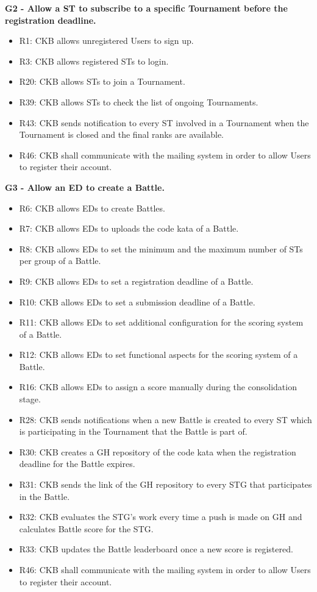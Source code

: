 \vspace{1.5cm}
\textbf{G2 - Allow a ST to subscribe to a specific Tournament before the registration deadline.}
\begin{itemize}
    \item R1: CKB allows unregistered Users to sign up.
    \item R3: CKB allows registered STs to login.
    \item R20: CKB allows STs to join a Tournament.
    \item R39: CKB allows STs to check the list of ongoing Tournaments.
    \item R43: CKB sends notification to every ST involved in a Tournament when the Tournament is closed and the final ranks are available.
    \item R46: CKB shall communicate with the mailing system in order to allow Users to register their account.
\end{itemize}


\vspace{1.5cm}
\textbf{G3 - Allow an ED to create a Battle.}
\begin{itemize}
    \item R6: CKB allows EDs to create Battles.
    \item R7: CKB allows EDs to uploads the code kata of a Battle.
    \item R8: CKB allows EDs to set the minimum and the maximum number of STs per group of a Battle.
    \item R9: CKB allows EDs to set a registration deadline of a Battle.
    \item R10: CKB allows EDs to set a submission deadline of a Battle.
    \item R11: CKB allows EDs to set additional configuration for the scoring system of a Battle.
    \item R12: CKB allows EDs to set functional aspects for the scoring system of a Battle.
    \item R16: CKB allows EDs to assign a score manually during the consolidation stage.
    \item R28: CKB sends notifications when a new Battle is created to every ST which is participating in the Tournament that the Battle is part of.
    \item R30: CKB creates a GH repository of the code kata when the registration deadline for the Battle expires.
    \item R31: CKB sends the link of the GH repository to every STG that participates in the Battle.
    \item R32: CKB evaluates the STG's work every time a push is made on GH and calculates Battle score for the STG.
    \item R33: CKB updates the Battle leaderboard once a new score is registered.
    \item R46: CKB shall communicate with the mailing system in order to allow Users to register their account.
\end{itemize}


